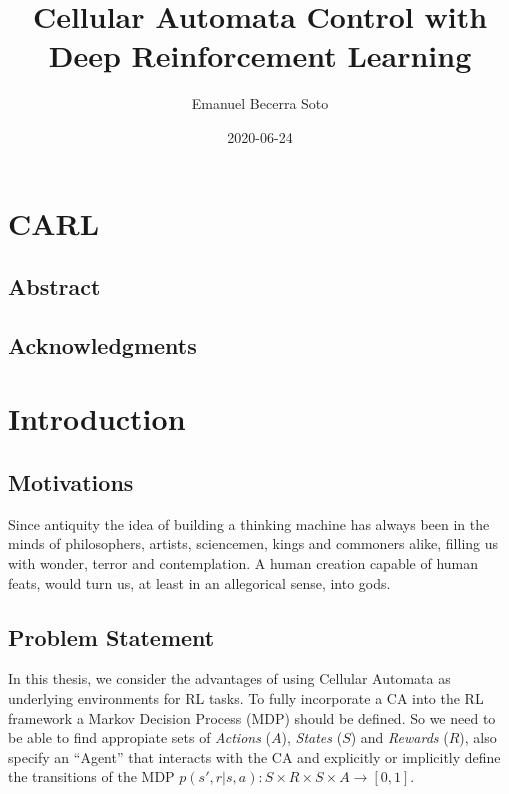 \documentclass[
  openany]{book}
\title{Cellular Automata Control with Deep Reinforcement Learning}
\author{Emanuel Becerra Soto}
\date{2020-06-24}
\begin{document}
\maketitle

{
\setcounter{tocdepth}{1}
\tableofcontents
}
\listoftables
\listoffigures
\hypertarget{carl}{%
\chapter{CARL}\label{carl}}

\hypertarget{abstract}{%
\section{Abstract}\label{abstract}}

\hypertarget{acknowledgments}{%
\section{Acknowledgments}\label{acknowledgments}}

\hypertarget{introduction}{%
\chapter{Introduction}\label{introduction}}

\hypertarget{motivations}{%
\section{Motivations}\label{motivations}}

Since antiquity the idea of building a thinking machine has always been in the minds of philosophers, artists, sciencemen, kings and commoners alike, filling us with wonder, terror and contemplation. A human creation capable of human feats, would turn us, at least in an allegorical sense, into gods.

\hypertarget{problem-statement}{%
\section{Problem Statement}\label{problem-statement}}

In this thesis, we consider the advantages of using Cellular Automata as underlying environments for RL tasks. To fully incorporate a CA into the RL framework a Markov Decision Process (MDP) should be defined. So we need to be able to find appropiate sets of \emph{Actions} (\(A\)), \emph{States} (\(S\)) and \emph{Rewards} (\(R\)), also specify an ``Agent'' that interacts with the CA and explicitly or implicitly define the transitions of the MDP \(p(s',r|s,a): S \times R \times S \times A \rightarrow [0,1]\).
\end{document}
